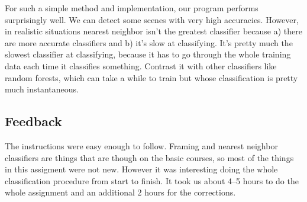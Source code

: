 For such a simple method and implementation, our program performs surprisingly
well. We can detect some scenes with very high accuracies.  However, in
realistic situations nearest neighbor isn't the greatest classifier because a)
there are more accurate classifiers and b) it's slow at classifying. It's
pretty much the slowest classifier at classifying, because it has to go through
the whole training data each time it classifies something. Contrast it with
other classifiers like random forests, which can take a while to train but
whose classification is pretty much instantaneous.

\subsection{Feedback}
The instructions were easy enough to follow. Framing and nearest neighbor
classifiers are things that are though on the basic courses, so most of the
things in this assigment were not new. However it was interesting doing the
whole classification procedure from start to finish.  It took us about 4--5
hours to do the whole assignment and an additional 2 hours for the corrections.
